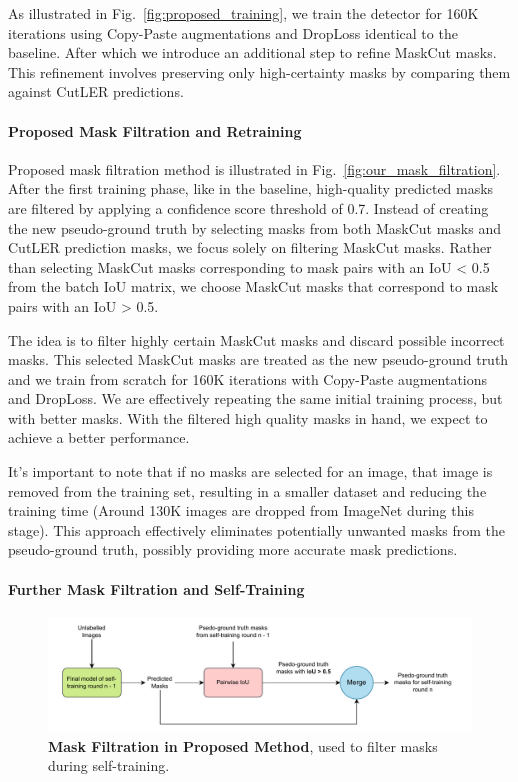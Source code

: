 As illustrated in Fig.~\ref{fig:proposed_training}, we train the detector for 160K iterations using Copy-Paste augmentations and DropLoss identical to the baseline. After which we introduce an additional step to refine MaskCut masks. This refinement involves preserving only high-certainty masks by comparing them against CutLER predictions.

\paragraph{Proposed Mask Filtration and Retraining}
Proposed mask filtration method is illustrated in Fig.~\ref{fig:our_mask_filtration}. After the first training phase, like in the baseline, high-quality predicted masks are filtered by applying a confidence score threshold of 0.7.  Instead of creating the new pseudo-ground truth by selecting masks from both MaskCut masks and CutLER prediction masks, we focus solely on filtering MaskCut masks. Rather than selecting MaskCut masks corresponding to mask pairs with an IoU < 0.5 from the batch IoU matrix, we choose MaskCut masks that correspond to mask pairs with an IoU > 0.5. 

The idea is to filter highly certain MaskCut masks and discard possible incorrect masks. This selected MaskCut masks are treated as the new pseudo-ground truth and we train from scratch for 160K iterations with Copy-Paste augmentations and DropLoss. We are effectively repeating the same initial training process, but with better masks. With the filtered high quality masks in hand, we expect to achieve a better performance. 

It’s important to note that if no masks are selected for an image, that image is removed from the training set, resulting in a smaller dataset and reducing the training time (Around 130K images are dropped from ImageNet during this stage). This approach effectively eliminates potentially unwanted masks from the pseudo-ground truth, possibly providing more accurate mask predictions.

\paragraph{Further Mask Filtration and Self-Training}
\label{section:proposed_mask_filtration_self_training}
\begin{figure}
	\centering
	\includegraphics[width=1\textwidth]{Images/main/our_filtration_self_training.pdf}
	\caption[\textbf{Mask Filtration in Proposed Method During Self-Training}]{\textbf{Mask Filtration in Proposed Method}, used to filter masks during self-training.}
	\label{fig:our_mask_filtration_self_training}
\end{figure}


